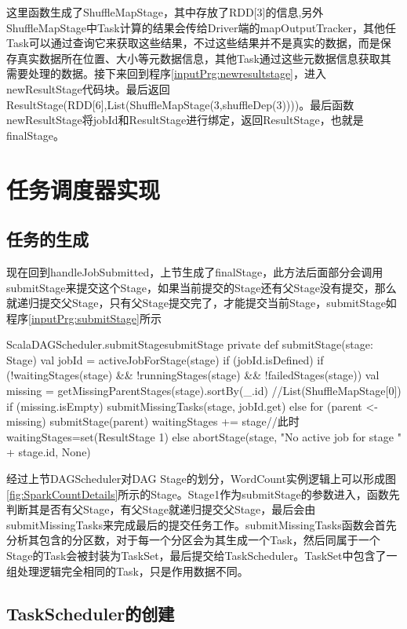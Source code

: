 这里函数生成了ShuffleMapStage，其中存放了RDD[3]的信息,另外ShuffleMapStage中Task计算的结果会传给Driver端的mapOutputTracker，其他任Task可以通过查询它来获取这些结果，不过这些结果并不是真实的数据，而是保存真实数据所在位置、大小等元数据信息，其他Task通过这些元数据信息获取其需要处理的数据。接下来回到程序\ref{inputPrg:newresultstage}，进入newResultStage代码块。最后返回ResultStage(RDD[6],List(ShuffleMapStage(3,shuffleDep(3))))。最后函数newResultStage将jobId和ResultStage进行绑定，返回ResultStage，也就是finalStage。
\section{任务调度器实现}
\subsection{任务的生成}

现在回到handleJobSubmitted，上节生成了finalStage，此方法后面部分会调用submitStage来提交这个Stage，如果当前提交的Stage还有父Stage没有提交，那么就递归提交父Stage，只有父Stage提交完了，才能提交当前Stage，submitStage如程序\ref{inputPrg:submitStage}所示
\begin{codeInput}{Scala}{DAGScheduler.submitStage}{submitStage}
private def submitStage(stage: Stage) {
  val jobId = activeJobForStage(stage)
  if (jobId.isDefined) {
    if (!waitingStages(stage) && !runningStages(stage) && !failedStages(stage)) {
      val missing = getMissingParentStages(stage).sortBy(_.id) //List(ShuffleMapStage[0])
      if (missing.isEmpty) {
        submitMissingTasks(stage, jobId.get)
      } else {
        for (parent <- missing) {
          submitStage(parent)
        }
        waitingStages += stage//此时waitingStages=set(ResultStage 1)
      }
    }
  } else {
    abortStage(stage, "No active job for stage " + stage.id, None)
  }
}
\end{codeInput}

经过上节DAGScheduler对DAG Stage的划分，WordCount实例逻辑上可以形成图\ref{fig:SparkCountDetails}所示的Stage。Stage1作为submitStage的参数进入，函数先判断其是否有父Stage，有父Stage就递归提交父Stage，最后会由submitMissingTasks来完成最后的提交任务工作。submitMissingTasks函数会首先分析其包含的分区数，对于每一个分区会为其生成一个Task，然后同属于一个Stage的Task会被封装为TaskSet，最后提交给TaskScheduler。TaskSet中包含了一组处理逻辑完全相同的Task，只是作用数据不同。
\subsection{TaskScheduler的创建}

